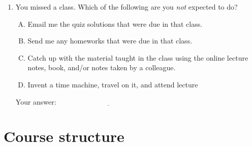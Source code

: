 \documentclass[10pt]{amsart}
\begin{document}
\begin{enumerate}
\item You missed a class. Which of the following are you {\em not}
  expected to do?

  \begin{enumerate}[(A)]
  \item Email me the quiz solutions that were due in that class.
  \item Send me any homeworks that were due in that class.
  \item Catch up with the material taught in the class using the
    online lecture notes, book, and/or notes taken by a colleague.
  \item Invent a time machine, travel on it, and attend lecture
  \end{enumerate}

  \vspace{0.1in}
  Your answer: $\underline{\qquad\qquad\qquad\qquad\qquad\qquad\qquad}$
  \vspace{0.1in}

\end{enumerate}

\section{Course structure}
\end{document}
